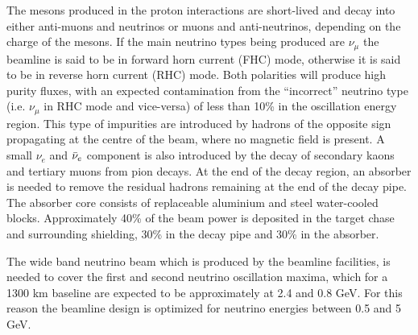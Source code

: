 The mesons produced in the proton interactions are short-lived and decay into either anti-muons and neutrinos or muons and anti-neutrinos, depending on the charge of the mesons. If the main neutrino types being produced are $\nu_\mu$ the beamline is said to be in forward horn current (FHC) mode, otherwise it is said to be in reverse horn current (RHC) mode.  Both polarities will produce high purity fluxes, with an expected contamination from the “incorrect” neutrino type (i.e. $\nu_\mu$ in RHC mode and vice-versa) of less than 10\% in the oscillation energy region. This type of impurities are introduced by hadrons of the opposite sign propagating at the centre of the beam, where no magnetic field is present. A small $\nu_e$ and $\Bar{\nu}_e$ component is also introduced by the decay of secondary kaons and tertiary muons from pion decays. At the end of the decay region, an absorber is needed to remove the residual hadrons remaining at the end of the decay pipe.  The absorber core consists of replaceable aluminium and steel water-cooled blocks. Approximately 40\% of the beam power is deposited in the target chase and surrounding shielding, 30\% in the decay pipe and 30\% in the absorber.

The wide band neutrino beam which is produced by the beamline facilities, is needed to cover the first and second neutrino oscillation maxima, which for a 1300 km baseline are expected to be approximately at 2.4 and 0.8 GeV. For this reason the beamline design is optimized for neutrino energies between 0.5 and 5 GeV. 

